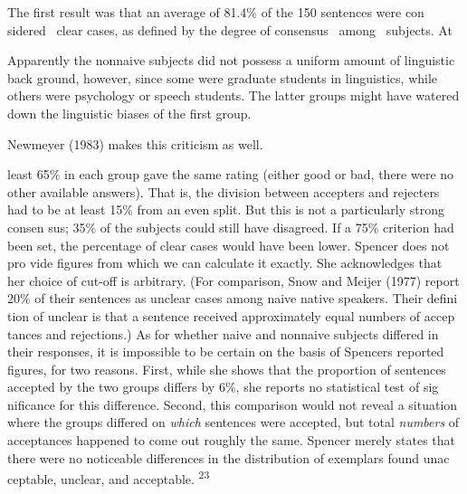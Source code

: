\begin{styleStandard}
The first result was that an average of 81.4\% of the 150 sentences were con\- sidered \ clear cases, as defined by the degree of consensus \ among \ subjects. At
\end{styleStandard}


\setcounter{listWWNumxxxviiileveli}{20}
\begin{listWWNumxxxviiileveli}
\item 
\begin{styleStandard}
Apparently the nonnaive subjects did not possess a uniform amount of linguistic back\- ground, however, since some were graduate students in linguistics, while others were psychology or speech students. The latter groups might have watered down the linguistic biases of the first group.
\end{styleStandard}


\item 
\begin{styleStandard}
Newmeyer (1983) makes this criticism as well.
\end{styleStandard}


\end{listWWNumxxxviiileveli}
\clearpage\setcounter{page}{1}\begin{styleStandard}
least 65\% in each group gave the same rating (either good or bad, there were no other available answers). That is, the division between accepters and rejecters had to be at least 15\% from an even split. But this is not a particularly strong consen\- sus; 35\% of the subjects could still have disagreed. If a 75\% criterion had been set, the percentage of clear cases would have been lower. Spencer does not pro\- vide figures from which we can calculate it exactly. She acknowledges that her choice of cut-off is arbitrary. (For comparison, Snow and Meijer (1977) report 20\% of their sentences as unclear cases among naive native speakers. Their defini\- tion of unclear is that a sentence received approximately equal numbers of accep\- tances and rejections.) As for whether naive and nonnaive subjects differed in their responses, it is impossible to be certain on the basis of Spencer{\textquotesingle}s reported figures, for two reasons. First, while she shows that the proportion of sentences accepted by the two groups differs by 6\%, she reports no statistical test of sig\- nificance for this difference. Second, this comparison would not reveal a situation where the groups differed on \textit{which}\textit{ }sentences were accepted, but total \textit{numbers}\textit{ }of acceptances happened to come out roughly the same. Spencer merely states that there were {\textquotedbl}no noticeable differences in the distribution of exemplars found unac\- ceptable, unclear, and acceptable.{\textquotedbl} \textsuperscript{23}
\end{styleStandard}


